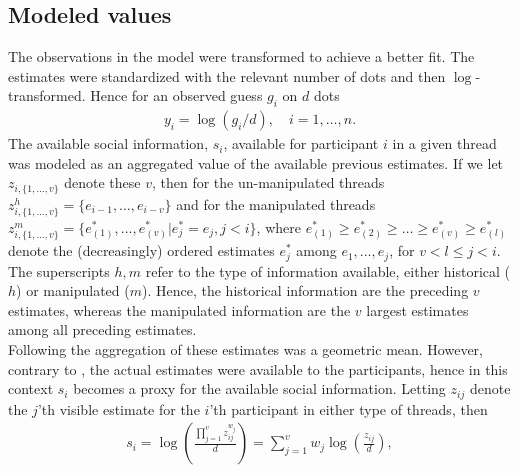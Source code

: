 \documentclass[9pt,a4paper,twocolumn,lineno]{article}
\begin{document}
\subsection*{Modeled values}
The observations in the model were transformed to achieve a better fit. The estimates were standardized with the relevant number of dots and then $\log$-transformed. Hence for an observed guess $g_i$ on $d$ dots 
\begin{align*}
	y_i = \log(g_i/d), \quad i=1,\dots,n.
\end{align*}
The available social information, $s_i$, available for participant $i$ in a given thread was modeled as an aggregated value of the available previous estimates. If we let $z_{i,\{1,\dots,v\}}$ denote these $v$, then for the un-manipulated threads $z^h_{i, \{1,\dots,v\}} = \{e_{i-1},\dots,e_{i-v}\}$ and for the manipulated threads $z^m_{i, \{1,\dots,v\}} = \{e^*_{(1)},\dots,e^*_{(v)} | e^*_j=e_j, j<i\}$, where $e^*_{(1)}\geq e^*_{(2)}\geq\dots\geq e^*_{(v)}\geq e^*_{(l)}$ denote the (decreasingly) ordered estimates $e^*_j$ among $e_1,\dots,e_j$, for $v<l\leq j<i$. The superscripts $h,m$ refer to the type of information available, either historical ($h$) or manipulated ($m$). Hence, the historical information are the preceding $v$ estimates, whereas the manipulated information are the $v$ largest estimates among all preceding estimates. \\
Following \citep{jayles2017social} the aggregation of these estimates was a geometric mean. However, contrary to \citep{jayles2017social}, the actual estimates were available to the participants, hence in this context $s_i$ becomes a proxy for the available social information. Letting $z_{ij}$ denote the $j$'th visible estimate for the $i$'th participant in either type of threads, then
\begin{align*}
	s_i = \log\left(\frac{\prod_{j=1}^v z_{ij}^{w_j}}{d}\right) %
	= \sum_{j=1}^v w_j \log\left(\frac{z_{ij}}{d}\right),
\end{align*}
\end{document}

